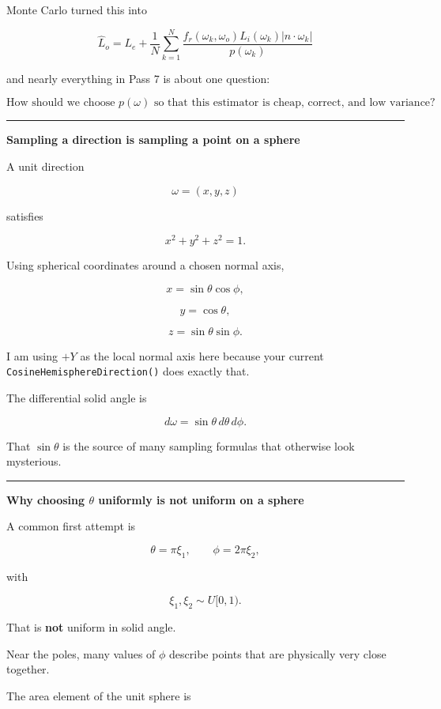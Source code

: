Monte Carlo turned this into

\[
\boxed{
\hat L_o
=
L_e+
\frac{1}{N}
\sum_{k=1}^{N}
\frac{
f_r(\omega_k,\omega_o)
L_i(\omega_k)
|n\cdot\omega_k|
}{
p(\omega_k)
}
}
\]

and nearly everything in Pass 7 is about one question:

\[
\boxed{
\text{How should we choose }p(\omega)\text{ so that this estimator is cheap, correct, and low variance?}
}
\]

\begin{center}\rule{0.5\linewidth}{0.5pt}\end{center}

\textbf{Sampling a direction is sampling a point on a sphere}

A unit direction

\[
\omega=(x,y,z)
\]

satisfies

\[
x^2+y^2+z^2=1.
\]

Using spherical coordinates around a chosen normal axis,

\[
x=\sin\theta\cos\phi,
\]

\[
y=\cos\theta,
\]

\[
z=\sin\theta\sin\phi.
\]

I am using \(+Y\) as the local normal axis here because your current \texttt{CosineHemisphereDirection()} does exactly that.

The differential solid angle is

\[
\boxed{
d\omega=\sin\theta\,d\theta\,d\phi.
}
\]

That \(\sin\theta\) is the source of many sampling formulas that otherwise look mysterious.

\begin{center}\rule{0.5\linewidth}{0.5pt}\end{center}

\textbf{Why choosing \(\theta\) uniformly is not uniform on a sphere}

A common first attempt is

\[
\theta=\pi\xi_1,
\qquad
\phi=2\pi\xi_2,
\]

with

\[
\xi_1,\xi_2\sim U[0,1).
\]

That is \textbf{not} uniform in solid angle.

Near the poles, many values of \(\phi\) describe points that are physically very close together.

The area element of the unit sphere is

